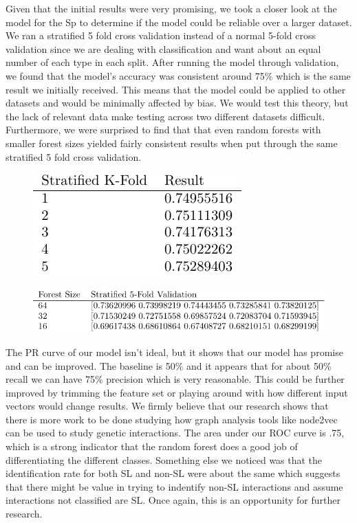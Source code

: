 Given that the initial results were very promising, we took a closer look at the model for the Sp to
determine if the model could be reliable over a larger dataset. We ran a stratified 5 fold cross
validation instead of a normal 5-fold cross validation since we are dealing with classification and
want about an equal number of each type in each split. After running the model through validation,
we found that the model's accuracy was consistent around 75\% which is the same result we initially
received. This means that the model could be applied to other datasets and would be minimally
affected by bias. We would test this theory, but the lack of relevant data make testing across
two different datasets difficult. Furthermore, we were surprised to find that that even random
forests with smaller forest sizes yielded fairly consistent results when put through the same
stratified 5 fold cross validation. 

\begin{figure}[t!]
\centering
%
\includegraphics[width=.38\textwidth]{figs/strat-128-dim}
%
\end{figure}



\begin{figure}[t!]
\centering
%
\includegraphics[width=.48\textwidth]{figs/strat}
%
\end{figure}

The PR curve of our model isn't ideal, but it shows that our model has promise and can be improved.
The baseline is 50\% and it appears that for about 50\% recall we can have 75\% precision which is
very reasonable. This could be further improved by trimming the feature set or playing around
with how different input vectors would change results. We firmly believe that our research shows that there is more work to be done studying how graph analysis tools like node2vec can be used to study genetic interactions. The area under our ROC curve is .75, which is a strong indicator that the random forest does a good job of differentiating the different classes. Something else we noticed was that the identification rate for both SL and non-SL were about the same which suggests that there might be value in trying to indentify non-SL interactions and assume interactions not classified are SL. Once again, this is an opportunity for further research. 

